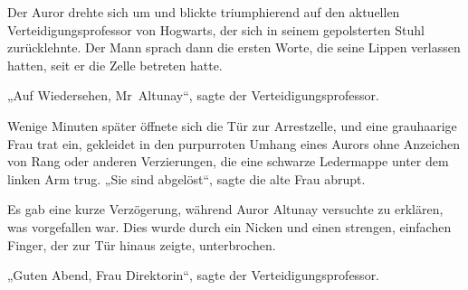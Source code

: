 
Der Auror drehte sich um und blickte triumphierend auf den aktuellen Verteidigungsprofessor von Hogwarts, der sich in seinem gepolsterten Stuhl zurücklehnte.
Der Mann sprach dann die ersten Worte, die seine Lippen verlassen hatten, seit er die Zelle betreten hatte.

„Auf Wiedersehen, Mr~Altunay“, sagte der Verteidigungsprofessor.

Wenige Minuten später öffnete sich die Tür zur Arrestzelle, und eine grauhaarige Frau trat ein, gekleidet in den purpurroten Umhang eines Aurors ohne Anzeichen von Rang oder anderen Verzierungen, die eine schwarze Ledermappe unter dem linken Arm trug.
„Sie sind abgelöst“, sagte die alte Frau abrupt.

Es gab eine kurze Verzögerung, während Auror Altunay versuchte zu erklären, was vorgefallen war. Dies wurde durch ein Nicken und einen strengen, einfachen Finger, der zur Tür hinaus zeigte, unterbrochen.

„Guten Abend, Frau Direktorin“, sagte der Verteidigungsprofessor.


